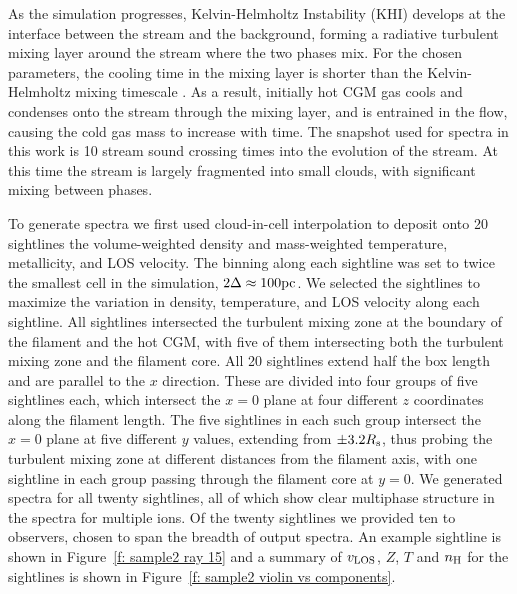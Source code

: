 \documentclass[fleqn,usenatbib]{mnras}
\begin{document}
As the simulation progresses, Kelvin-Helmholtz Instability (KHI) develops at the interface between the stream and the background, forming a radiative turbulent mixing layer around the stream where the two phases mix.
For the chosen parameters, the cooling time in the mixing layer is shorter than the Kelvin-Helmholtz mixing timescale \citep{mandelker2020Instability}.
As a result, initially hot CGM gas cools and condenses onto the stream through the mixing layer, and is entrained in the flow, causing the cold gas mass to increase with time.
The snapshot used for spectra in this work is 10 stream sound crossing times into the evolution of the stream.
At this time the stream is largely fragmented into small clouds, with significant mixing between phases.

To generate spectra we first used cloud-in-cell interpolation to deposit onto 20 sightlines the volume-weighted density and mass-weighted temperature, metallicity, and LOS velocity.
The binning along each sightline was set to twice the smallest cell in the simulation, $2\Delta \approx 100{\rm pc}$.
We selected the sightlines to maximize the variation in density, temperature, and LOS velocity along each sightline.
All sightlines intersected the turbulent mixing zone at the boundary of the filament and the hot CGM, with five of them intersecting both the turbulent mixing zone and the filament core.
All 20 sightlines extend half the box length and are parallel to the $x$ direction.
These are divided into four groups of five sightlines each, which intersect the $x=0$ plane at four different $z$ coordinates along the filament length.
The five sightlines in each such group intersect the $x=0$ plane at five different $y$ values, extending from $\pm 3.2R_{\rm s}$, thus probing the turbulent mixing zone at different distances from the filament axis, with one sightline in each group passing through the filament core at $y=0$.
We generated spectra for all twenty sightlines, all of which show clear multiphase structure in the spectra for multiple ions.
Of the twenty sightlines we provided ten to observers, chosen to span the breadth of output spectra.
An example sightline is shown in Figure~\ref{f: sample2 ray 15} and a summary of $v_{\rm LOS}$, $Z$, $T$ and $n_{\rm H}$ for the sightlines is shown in Figure~\ref{f: sample2 violin vs components}.
\end{document}

